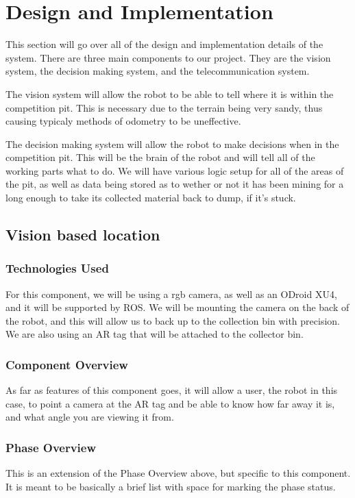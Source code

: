 
\chapter{Design  and Implementation}
This section will go over all of the design and implementation details of the system. There are three main components to our project. They are the vision system, the decision making system, and the telecommunication system.

The vision system will allow the robot to be able to tell where it is within the competition pit. This is necessary due to the terrain being very sandy, thus causing typicaly methods of odometry to be uneffective.

The decision making system will allow the robot to make decisions when in the competition pit. This will be the brain of the robot and will tell all of the working parts what to do. We will have various logic setup for all of the areas of the pit, as well as data being stored as to wether or not it has been mining for a long enough to take its collected material back to dump, if it's stuck.

\section{Vision based location }

\subsection{Technologies  Used}
For this component, we will be using a rgb camera, as well as an ODroid XU4, and it will be supported by ROS. We will be mounting the camera on the back of the robot, and this will allow us to back up to the collection bin with precision. We are also using an AR tag that will be attached to the collector bin.

\subsection{Component  Overview}
As far as features of this component goes, it will allow a user, the robot in this case, to point a camera at the AR tag and be able to know how far away it is, and what angle you are viewing it from.

\subsection{Phase Overview}
This is an extension of the Phase Overview above, but specific to this component. 
 It is meant to be basically a brief list with space for marking the phase status. 


